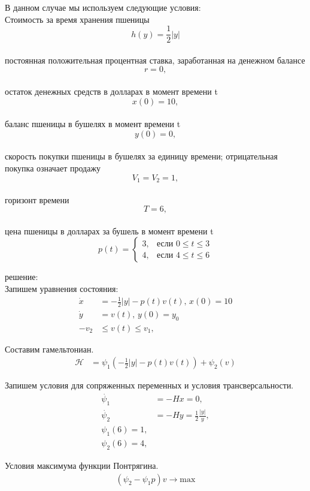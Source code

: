 В данном случае мы используем следующие условия:\\
 Стоимость за время хранения пшеницы $$ h(y) = \frac{1}{2}|y|$$\\
постоянная положительная процентная ставка, заработанная на денежном балансе $$ r = 0, $$\\
остаток денежных средств в долларах в момент времени t $$ x(0) = 10, $$\\
баланс пшеницы в бушелях в момент времени t $$ y(0) = 0, $$\\
скорость покупки пшеницы в бушелях за единицу времени; отрицательная покупка означает продажу $$ V_{1} = V_{2} = 1, $$\\
горизонт времени $$ T = 6, $$\\
цена пшеницы в долларах за бушель в момент времени t
\begin{displaymath}
p(t) =\left\{ \begin{array}{ll}
 3, & \textrm{если $0 \le t\le 3$}\\
 4, & \textrm{если $4  \le t  \le 6$}
  \end{array} \right.
\end{displaymath}


решение:\\

Запишем уравнения состояния:
\begin{align}
    \Dot{x} & = - \frac{1}{2}|y| - p(t) v(t),\, x(0) = 10 \\
    \Dot{y} & = v(t), \, y(0) = y_{0}\\
    - v_2 & \le v(t) \le v_1,
\end{align}     

Составим гамельтониан. 
\begin{align}
    \mathcal{H} & = \psi_{1} (- \frac{1}{2}|y| - p(t) v(t)) + \psi_{2} (v)
\end{align} 

Запишем условия для сопряженных переменных и условия трансверсальности.
\begin{align}
    \Dot{\psi_{1}} & = -H x = 0,\\
    \Dot{\psi_{2}} & = -H y =  \frac{1}{2}\frac{|y|}{y},\\
    {\psi_{1}(6)} = 1,\\
    {\psi_{2}(6)} = 4,
\end{align} 

Условия максимума функции Понтрягина.
\begin{align}
    (\psi_{2} - \psi_{1} p)v\to \mathrm{max}
\end{align} 

